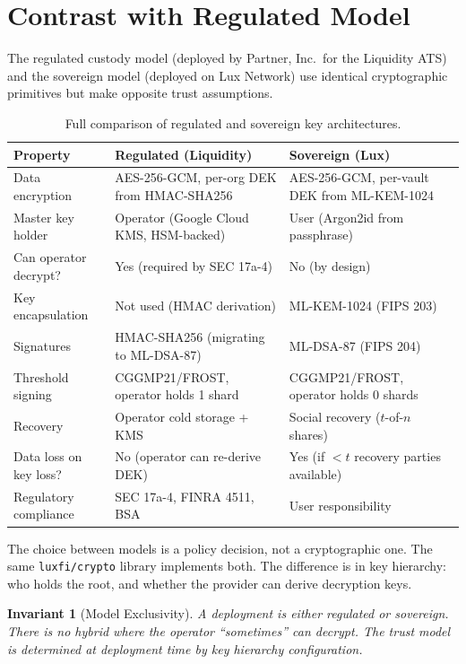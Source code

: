 \documentclass[11pt,a4paper]{article}
\newtheorem{invariant}{Invariant}[section]
\begin{document}
\section{Contrast with Regulated Model}
\label{sec:contrast}

The regulated custody model (deployed by Partner, Inc.\ for the Liquidity ATS)
and the sovereign model (deployed on Lux Network) use identical cryptographic
primitives but make opposite trust assumptions.

\begin{table}[h]
\centering
\small
\begin{tabular}{@{}p{3.2cm}p{5cm}p{5cm}@{}}
\toprule
\textbf{Property} & \textbf{Regulated (Liquidity)} & \textbf{Sovereign (Lux)} \\
\midrule
Data encryption &
  AES-256-GCM, per-org DEK from HMAC-SHA256 &
  AES-256-GCM, per-vault DEK from ML-KEM-1024 \\[4pt]
Master key holder &
  Operator (Google Cloud KMS, HSM-backed) &
  User (Argon2id from passphrase) \\[4pt]
Can operator decrypt? &
  Yes (required by SEC 17a-4) &
  No (by design) \\[4pt]
Key encapsulation &
  Not used (HMAC derivation) &
  ML-KEM-1024 (FIPS 203) \\[4pt]
Signatures &
  HMAC-SHA256 (migrating to ML-DSA-87) &
  ML-DSA-87 (FIPS 204) \\[4pt]
Threshold signing &
  CGGMP21/FROST, operator holds 1 shard &
  CGGMP21/FROST, operator holds 0 shards \\[4pt]
Recovery &
  Operator cold storage + KMS &
  Social recovery ($t$-of-$n$ shares) \\[4pt]
Data loss on key loss? &
  No (operator can re-derive DEK) &
  Yes (if $< t$ recovery parties available) \\[4pt]
Regulatory compliance &
  SEC 17a-4, FINRA 4511, BSA &
  User responsibility \\
\bottomrule
\end{tabular}
\caption{Full comparison of regulated and sovereign key architectures.}
\label{tab:full-comparison}
\end{table}

The choice between models is a policy decision, not a cryptographic one.
The same \texttt{luxfi/crypto} library implements both.  The difference
is in key hierarchy: who holds the root, and whether the provider can
derive decryption keys.

\begin{invariant}[Model Exclusivity]
A deployment is either regulated or sovereign.  There is no hybrid where
the operator ``sometimes'' can decrypt.  The trust model is determined at
deployment time by key hierarchy configuration.
\end{invariant}
\end{document}
